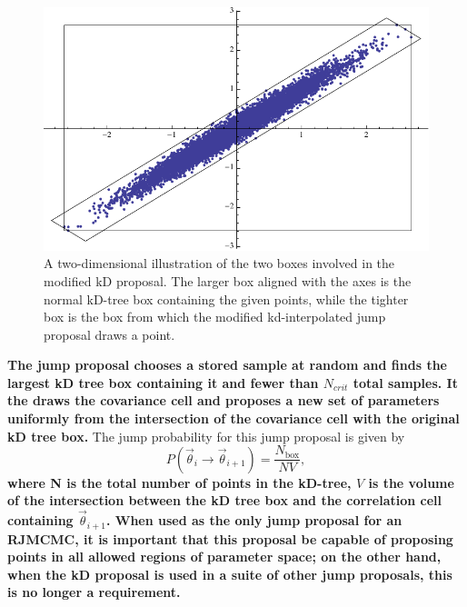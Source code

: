 \documentclass{iopart}
\newcommand{\vtheta}{\vec{\theta}}
\newcommand{\Nbox}{N_\mathrm{box}}
\newcommand{\Vbox}{V_\mathrm{box}}
\newcommand{\ee}{\end{equation}}
\newcommand{\bel}[1]{\begin{equation}\label{#1}}
\newcommand{\ilya}[1]{{\color{red} \bf #1}}
\newcommand{\dan}[1]{{\color{magenta} \bf #1}}
\begin{document}
\begin{figure}
  \includegraphics[width=0.8\columnwidth]{PCC}
  \caption{\label{fig:PCC} A two-dimensional illustration of the two
    boxes involved in the modified kD proposal.  The larger box
    aligned with the axes is the normal kD-tree box containing the
    given points, while the tighter box is the box from which the
    modified kd-interpolated jump proposal draws a point. }
\end{figure}

\dan{The jump proposal chooses a stored sample at random and finds the largest kD tree box containing it and fewer than $N_{crit}$ total samples. It the draws the covariance cell and proposes a new set of parameters uniformly from the intersection of the covariance cell with the original kD tree box.}
The jump probability for this jump proposal is given by
%
\bel{modforward} P(\vtheta_i \rightarrow \vtheta_{i+1}) =
\frac{\Nbox}{N V} , \ee
%
\dan{where N is the total number of points in the kD-tree, $V$ is the
volume of the intersection between the kD tree box and the correlation cell containing $\vtheta_{i+1}$. When used as the only jump proposal for an
RJMCMC, it is important that this proposal be capable of
proposing points in all allowed regions of parameter space; on the
other hand, when the kD proposal is used in a suite of other jump proposals, this is no longer a requirement.}

%
%
\end{document}
